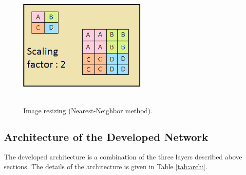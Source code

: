 \documentclass[conference]{IEEEtran}
\begin{document}
\begin{figure}[!t]
	\centerline{\includegraphics[width=2.5in, height=2.5in]{nearest_neighbor}}
	\caption{Image resizing (Nearest-Neighbor method). \cite{nearest_neighbour}}
	\label{fig:nearest_neighbor}
\end{figure}

\subsection{Architecture of the Developed Network}
The developed architecture is a combination of the three layers described above sections. The details of the architecture is given in Table \ref{tab:archi}.
\end{document}

